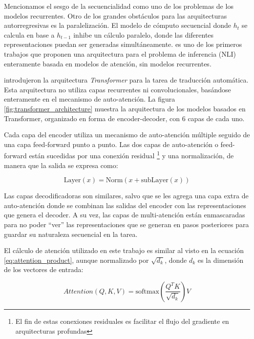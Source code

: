 Mencionamos el sesgo de la secuencialidad como uno de los problemas de los modelos recurrentes. Otro de los grandes obstáculos para las arquitecturas autorregresivas es la paralelización. El modelo de cómputo secuencial donde $h_t$ se calcula en base a $h_{t-1}$ inhibe un cálculo paralelo, donde las diferentes representaciones puedan ser generadas simultáneamente. \citet{parikh-etal-2016-decomposable} es uno de los primeros trabajos que proponen una arquitectura para el problema de inferencia (NLI) enteramente basada en modelos de atención, sin modelos recurrentes.

\citet{vaswani2017attention} introdujeron la arquitectura \emph{Transformer} para la tarea de traducción automática. Esta arquitectura no utiliza capas recurrentes ni convolucionales, basándose enteramente en el mecanismo de auto-atención. La figura \ref{fig:transformer_architecture} muestra la arquitectura de los modelos basados en Transformer, organizado en forma de encoder-decoder, con 6 capas de cada uno.

Cada capa del encoder utiliza un mecanismo de auto-atención múltiple seguido de una capa feed-forward punto a punto. Las dos capas de auto-atención o feed-forward están sucedidas por una conexión residual \cite{he2016deep} \footnote{El fin de estas conexiones residuales es facilitar el flujo del gradiente en arquitecturas profundas} y una normalización, de manera que la salida se expresa como:

\begin{equation*}
    \text{Layer}(x) = \text{Norm}(x + \text{subLayer}(x))
\end{equation*}

Las capas decodificadoras son similares, salvo que se les agrega una capa extra de auto-atención donde se combinan las salidas del encoder con las representaciones que genera el decoder. A su vez, las capas de multi-atención están enmascaradas para no poder ``ver'' las representaciones que se generan en pasos posteriores para guardar su naturaleza secuencial en la tarea.

El cálculo de atención utilizado en este trabajo es similar al visto en la ecuación \ref{eq:attention_product}, aunque normalizado por $\sqrt{d_k}$, donde $d_k$ es la dimensión de los vectores de entrada:

\begin{equation*}
    Attention(Q, K, V) = \text{softmax}(\frac{Q^T K}{\sqrt{d_k}}) V
\end{equation*}

